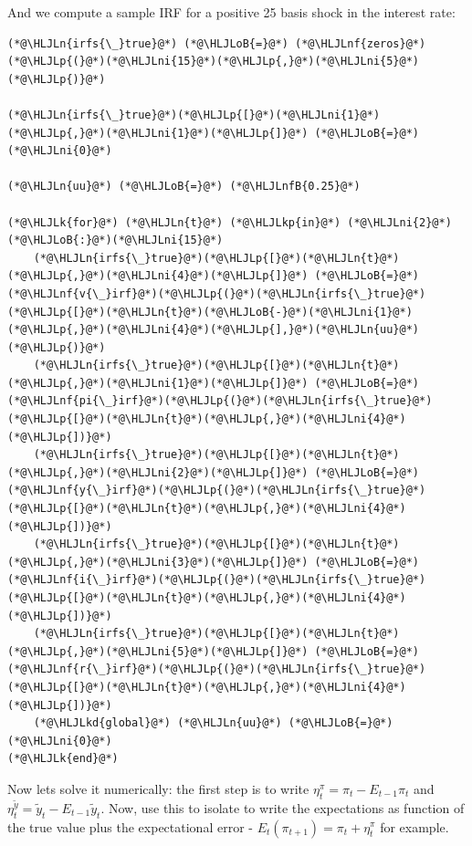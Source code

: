 \documentclass[12pt,a4paper]{article}
\newcommand{\HLJLk}[1]{\textcolor[RGB]{148,91,176}{\textbf{#1}}}
\newcommand{\HLJLkd}[1]{\textcolor[RGB]{214,102,97}{\textit{#1}}}
\newcommand{\HLJLkp}[1]{\textcolor[RGB]{148,91,176}{\textbf{#1}}}
\newcommand{\HLJLn}[1]{#1}
\newcommand{\HLJLnf}[1]{\textcolor[RGB]{66,102,213}{#1}}
\newcommand{\HLJLnfB}[1]{\textcolor[RGB]{59,151,46}{#1}}
\newcommand{\HLJLni}[1]{\textcolor[RGB]{59,151,46}{#1}}
\newcommand{\HLJLoB}[1]{\textcolor[RGB]{102,102,102}{\textbf{#1}}}
\newcommand{\HLJLp}[1]{#1}
\begin{document}
And we compute a sample IRF for a positive 25 basis shock in the interest rate:


\begin{lstlisting}
(*@\HLJLn{irfs{\_}true}@*) (*@\HLJLoB{=}@*) (*@\HLJLnf{zeros}@*)(*@\HLJLp{(}@*)(*@\HLJLni{15}@*)(*@\HLJLp{,}@*)(*@\HLJLni{5}@*)(*@\HLJLp{)}@*)

(*@\HLJLn{irfs{\_}true}@*)(*@\HLJLp{[}@*)(*@\HLJLni{1}@*)(*@\HLJLp{,}@*)(*@\HLJLni{1}@*)(*@\HLJLp{]}@*) (*@\HLJLoB{=}@*) (*@\HLJLni{0}@*)

(*@\HLJLn{uu}@*) (*@\HLJLoB{=}@*) (*@\HLJLnfB{0.25}@*)

(*@\HLJLk{for}@*) (*@\HLJLn{t}@*) (*@\HLJLkp{in}@*) (*@\HLJLni{2}@*)(*@\HLJLoB{:}@*)(*@\HLJLni{15}@*)
    (*@\HLJLn{irfs{\_}true}@*)(*@\HLJLp{[}@*)(*@\HLJLn{t}@*)(*@\HLJLp{,}@*)(*@\HLJLni{4}@*)(*@\HLJLp{]}@*) (*@\HLJLoB{=}@*) (*@\HLJLnf{v{\_}irf}@*)(*@\HLJLp{(}@*)(*@\HLJLn{irfs{\_}true}@*)(*@\HLJLp{[}@*)(*@\HLJLn{t}@*)(*@\HLJLoB{-}@*)(*@\HLJLni{1}@*)(*@\HLJLp{,}@*)(*@\HLJLni{4}@*)(*@\HLJLp{],}@*)(*@\HLJLn{uu}@*)(*@\HLJLp{)}@*)
    (*@\HLJLn{irfs{\_}true}@*)(*@\HLJLp{[}@*)(*@\HLJLn{t}@*)(*@\HLJLp{,}@*)(*@\HLJLni{1}@*)(*@\HLJLp{]}@*) (*@\HLJLoB{=}@*) (*@\HLJLnf{pi{\_}irf}@*)(*@\HLJLp{(}@*)(*@\HLJLn{irfs{\_}true}@*)(*@\HLJLp{[}@*)(*@\HLJLn{t}@*)(*@\HLJLp{,}@*)(*@\HLJLni{4}@*)(*@\HLJLp{])}@*)
    (*@\HLJLn{irfs{\_}true}@*)(*@\HLJLp{[}@*)(*@\HLJLn{t}@*)(*@\HLJLp{,}@*)(*@\HLJLni{2}@*)(*@\HLJLp{]}@*) (*@\HLJLoB{=}@*) (*@\HLJLnf{y{\_}irf}@*)(*@\HLJLp{(}@*)(*@\HLJLn{irfs{\_}true}@*)(*@\HLJLp{[}@*)(*@\HLJLn{t}@*)(*@\HLJLp{,}@*)(*@\HLJLni{4}@*)(*@\HLJLp{])}@*)
    (*@\HLJLn{irfs{\_}true}@*)(*@\HLJLp{[}@*)(*@\HLJLn{t}@*)(*@\HLJLp{,}@*)(*@\HLJLni{3}@*)(*@\HLJLp{]}@*) (*@\HLJLoB{=}@*) (*@\HLJLnf{i{\_}irf}@*)(*@\HLJLp{(}@*)(*@\HLJLn{irfs{\_}true}@*)(*@\HLJLp{[}@*)(*@\HLJLn{t}@*)(*@\HLJLp{,}@*)(*@\HLJLni{4}@*)(*@\HLJLp{])}@*)
    (*@\HLJLn{irfs{\_}true}@*)(*@\HLJLp{[}@*)(*@\HLJLn{t}@*)(*@\HLJLp{,}@*)(*@\HLJLni{5}@*)(*@\HLJLp{]}@*) (*@\HLJLoB{=}@*) (*@\HLJLnf{r{\_}irf}@*)(*@\HLJLp{(}@*)(*@\HLJLn{irfs{\_}true}@*)(*@\HLJLp{[}@*)(*@\HLJLn{t}@*)(*@\HLJLp{,}@*)(*@\HLJLni{4}@*)(*@\HLJLp{])}@*)
    (*@\HLJLkd{global}@*) (*@\HLJLn{uu}@*) (*@\HLJLoB{=}@*) (*@\HLJLni{0}@*)
(*@\HLJLk{end}@*)
\end{lstlisting}


Now lets solve it numerically: the first step is to write $\eta_t^{\pi} = \pi_t - E_{t-1} \pi_t$ and $\eta_t^{\tilde{y}} = \tilde{y}_t - E_{t-1} \tilde{y}_t$. Now, use this to isolate to write the expectations as function of the true value plus the expectational error - $E_t(\pi_{t+1}) = \pi_t + \eta_t^{\pi}$ for example.
\end{document}
